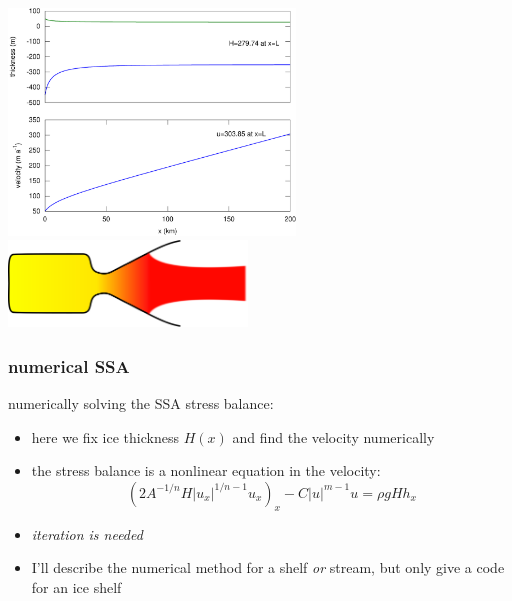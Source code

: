 \documentclass[titlepage,letterpaper,final,12pt]{scrartcl}
\newcommand{\alert}[1]{\emph{#1}}
\begin{document}
\begin{center}
  \includegraphics[width=3.0in]{steadyshelf} \hfill \includegraphics[width=2.5in]{Rocket_nozzle_expansion}
\end{center}


\subsubsection*{numerical SSA}

numerically solving the SSA stress balance:
\begin{itemize}
\item here we fix ice thickness $H(x)$ and find the velocity numerically
\item the stress balance is a nonlinear equation in the velocity:
  $$\left(2 A^{-1/n} H |u_x|^{1/n - 1} u_x\right)_x - C|u|^{m-1}u = \rho g H h_x$$
\item \alert{iteration is needed}
\item I'll describe the numerical method for a shelf \emph{or} stream, but only give a code for an ice shelf
\end{itemize}
\end{document}
